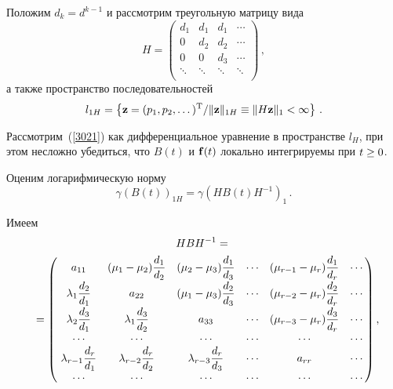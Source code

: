 \begin{multicols}{2}
{}

Положим $d_k = d^{k-1}$ и рассмотрим треугольную матрицу вида
\begin{equation*}
H=\left(
\begin{array}{ccccccc}
d_1   & d_1 & d_1 & \cdots  \\
0   & d_2  & d_2  &   \cdots  \\
0   & 0  & d_3  &   \cdots  \\
\ddots & \ddots & \ddots &\ddots\\
\end{array}
\right)\,,
\end{equation*}
а также пространство последовательностей  
$$
l_{1H}=\left\{{\bf z} = (p_1,p_2,\dots)^{\mathrm{T}} / \|{\bf z}\|_{1H}\equiv \|H {\bf z}\|_1 <\infty
\right\}\,.
$$

Рассмотрим~(\ref{3021}) как дифференциальное уравнение в пространстве $l_{H}$, 
при этом несложно убедиться, что $B(t)$ и ${\bf f}(t)$ локально интегрируемы  при $t \hm\ge 0$.

Оценим логарифмическую норму
\begin{equation*}
\gamma \left(B(t)\right)_{1H} = \gamma \left(H B(t)H^{-1}\right)_{1} \,. 
\end{equation*}

Имеем
{\scriptsize
\begin{multline*}
H B H^{-1}={}\\
\!\!{}=\left(\!
\begin{array}{cccccc}
a_{11}  &  (\mu_1-\mu_2) \fr{d_1}{d_2}  & (\mu_2-\mu_3)\fr{d_1}{d_3}  & \cdots &  (\mu_{r-1}-\mu_r)\fr{d_1}{d_r} & \cdots \\
\la_1 \fr{d_2}{d_1} &  a_{22}  &(\mu_1-\mu_3)\fr{d_2}{d_3}  & \cdots &  (\mu_{r-2}-\mu_r)\fr{d_2}{d_r} & \cdots \\
\la_2 \fr{d_3}{d_1} &  \la_1\fr{d_3}{d_2}   &a_{33}   & \cdots &  (\mu_{r-3}-\mu_r)\fr{d_3}{d_r}  & \cdots \\
\cdots & \cdots & \cdots& \cdots & \cdots &\cdots\\
\la_{r-1} \fr{d_r}{d_1} & \la_{r-2} \fr{d_r}{d_2}  & \la_{r-3} \fr{d_r}{d_3}  & \cdots & a_{rr} & \cdots\\
 \cdots & \cdots & \cdots& \cdots& \cdots& \cdots \\
\end{array}\!\!
\right), \hspace*{-7.94606pt}
\end{multline*}}


\end{multicols}
